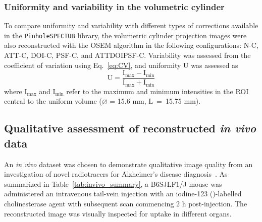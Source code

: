 \documentclass[utf8]{FrontiersinHarvard} %
\begin{document}
\subsubsection{Uniformity and variability in the volumetric cylinder}

To compare uniformity and variability with different types of corrections available in the \texttt{PinholeSPECTUB} library, the volumetric cylinder projection images were also reconstructed with the OSEM algorithm in the following configurations: N-C, ATT-C, DOI-C, PSF-C, and \mbox{ATTDOIPSF-C}. Variability was assessed from the coefficient of variation using Eq.~\ref{eq:CV}, and uniformity $\mathrm{U}$ was assessed as
\begin{equation}
	\mathrm{U} = \frac{\mathrm{I_{max}} - \mathrm{I_{min}}}{\mathrm{I_{max}} + \mathrm{I_{min}}}
\end{equation}
where $\mathrm{I_{max}}$ and $\mathrm{I_{min}}$ refer to the maximum and minimum intensities in the ROI central to the uniform volume ($\diameter$ = 15.6 mm, $\mathrm{L}$~=~15.75 mm). 




\subsection{Qualitative assessment of reconstructed \textit{in vivo} data}

An \textit{in vivo} dataset was chosen to demonstrate qualitative image quality from an investigation of novel radiotracers for Alzheimer's disease diagnosis~\cite{debay}. As summarized in Table~\ref{tab:invivo_summary}, a B6SJLF1/J mouse was administered an intravenous tail-vein injection with an iodine-123 ()-labelled cholinesterase agent with subsequent scan commencing 2 h post-injection. The reconstructed image was visually inspected for uptake in different organs.
\end{document}
